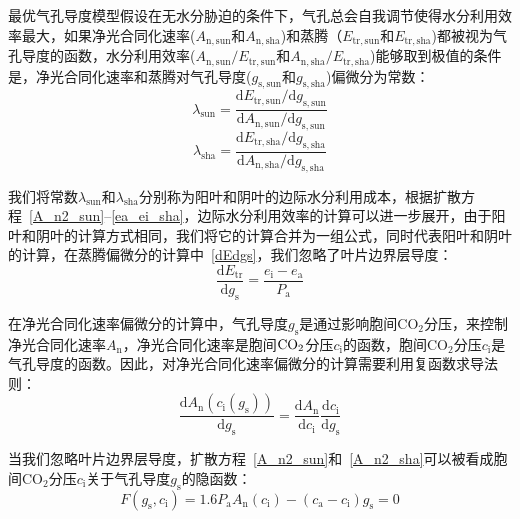 最优气孔导度模型假设在无水分胁迫的条件下，气孔总会自我调节使得水分利用效率最大，如果净光合同化速率($ A_{\mathrm{n,sun}}$和$ A_{\mathrm{n,sha}}$)和蒸腾（$ E_{\mathrm{tr,sun}}$和$ E_{\mathrm{tr,sha}}$)都被视为气孔导度的函数，水分利用效率($ A_{\mathrm{n,sun}}/E_{\mathrm{tr,sun}}$和$ A_{\mathrm{n,sha}}/E_{\mathrm{tr,sha}}$)能够取到极值的条件是，净光合同化速率和蒸腾对气孔导度($ g_{\mathrm{s,sun}}$和$ g_{\mathrm{s,sha}}$)偏微分为常数：
\begin{equation}\label{lambda_sun}
\lambda_{\mathrm{sun}}=\frac{\mathrm{d} E_{\mathrm{tr,sun}}/\mathrm{d} g_{\mathrm{s,sun}}}{\mathrm{d} A_{\mathrm{n,sun}}/\mathrm{d} g_{\mathrm{s,sun}}}
\end{equation}
\begin{equation}\label{lambda_sha}
\lambda_{\mathrm{sha}}=\frac{\mathrm{d} E_{\mathrm{tr,sha}}/\mathrm{d} g_{\mathrm{s,sha}}}{\mathrm{d} A_{\mathrm{n,sha}}/\mathrm{d} g_{\mathrm{s,sha}}}
\end{equation}

我们将常数$\lambda_{\mathrm{sun}}$和$\lambda_{\mathrm{sha}}$分别称为阳叶和阴叶的边际水分利用成本，根据扩散方程~\eqref{A_n2_sun}--\eqref{ea_ei_sha}，边际水分利用效率的计算可以进一步展开，由于阳叶和阴叶的计算方式相同，我们将它的计算合并为一组公式，同时代表阳叶和阴叶的计算，在蒸腾偏微分的计算中~\eqref{dEdgs}，我们忽略了叶片边界层导度：
\begin{equation}\label{dEdgs}
\frac{\mathrm{d} E_{\mathrm{tr}}}{\mathrm{d} g_{\mathrm{s}}}=\frac{e_{\mathrm{i}}-e_{\mathrm{a}}}{P_{\mathrm {a}}}
\end{equation}

在净光合同化速率偏微分的计算中，气孔导度$g_{\mathrm{s}}$是通过影响胞间$\mathrm {CO_2}$分压，来控制净光合同化速率$A_{\mathrm{n}}$，净光合同化速率是胞间$\rm CO_2$分压$c_{\mathrm{i}}$的函数，胞间$\mathrm {CO_2}$分压$c_{\mathrm{i}}$是气孔导度的函数。因此，对净光合同化速率偏微分的计算需要利用复函数求导法则：
\begin{equation}\label{dAdgs1}
\frac{\mathrm{d} A_{\mathrm{n}}\left(c_{\mathrm{i}}\left(g_{\mathrm{s}}\right)\right)}{\mathrm{d} g_{\mathrm{s}}}= \frac{\mathrm{d} A_{\mathrm{n}}}{\mathrm{d} c_{\mathrm{i}}}\frac{\mathrm{d} c_{\mathrm{i}}}{\mathrm{d} g_{\mathrm{s}}}
\end{equation}

当我们忽略叶片边界层导度，扩散方程~\eqref{A_n2_sun}和~\eqref{A_n2_sha}可以被看成胞间$\mathrm {CO_2}$分压$c_{\mathrm{i}}$关于气孔导度$g_{\mathrm{s}}$的隐函数：
\begin{equation}\label{cigsimplicit}
F\left(g_{\mathrm{s}},c_{\mathrm{i}}\right)=1.6P_{\mathrm {a}}A_{\mathrm{n}}\left(c_{\mathrm{i}}\right)-\left(c_{\mathrm{a}}-c_{\mathrm{i}}\right) g_{\mathrm{s}}=0
\end{equation}

